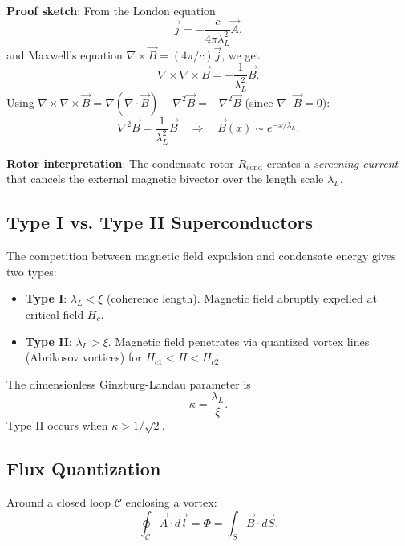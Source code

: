 \documentclass[12pt,a4paper]{article}
\theoremstyle{definition}
\theoremstyle{remark}
\begin{document}
\textbf{Proof sketch}: From the London equation
\begin{equation}
\vec{j} = -\frac{c}{4\pi \lambda_L^2} \vec{A},
\end{equation}
and Maxwell's equation $\nabla \times \vec{B} = (4\pi/c) \vec{j}$, we get
\begin{equation}
\nabla \times \nabla \times \vec{B} = -\frac{1}{\lambda_L^2} \vec{B}.
\end{equation}
Using $\nabla \times \nabla \times \vec{B} = \nabla(\nabla \cdot \vec{B}) - \nabla^2 \vec{B} = -\nabla^2 \vec{B}$ (since $\nabla \cdot \vec{B} = 0$):
\begin{equation}
\nabla^2 \vec{B} = \frac{1}{\lambda_L^2} \vec{B} \quad \Rightarrow \quad \vec{B}(x) \sim e^{-x/\lambda_L}.
\end{equation}

\textbf{Rotor interpretation}: The condensate rotor $R_{\text{cond}}$ creates a \emph{screening current} that cancels the external magnetic bivector over the length scale $\lambda_L$.

\subsection{Type I vs. Type II Superconductors}

The competition between magnetic field expulsion and condensate energy gives two types:

\begin{itemize}
\item \textbf{Type I}: $\lambda_L < \xi$ (coherence length). Magnetic field abruptly expelled at critical field $H_c$.
\item \textbf{Type II}: $\lambda_L > \xi$. Magnetic field penetrates via quantized vortex lines (Abrikosov vortices) for $H_{c1} < H < H_{c2}$.
\end{itemize}

The dimensionless Ginzburg-Landau parameter is
\begin{equation}
\kappa = \frac{\lambda_L}{\xi}.
\end{equation}
Type II occurs when $\kappa > 1/\sqrt{2}$.

\subsection{Flux Quantization}

Around a closed loop $\mathcal{C}$ enclosing a vortex:
\begin{equation}
\oint_{\mathcal{C}} \vec{A} \cdot d\vec{l} = \Phi = \int_S \vec{B} \cdot d\vec{S}.
\end{equation}
\end{document}
